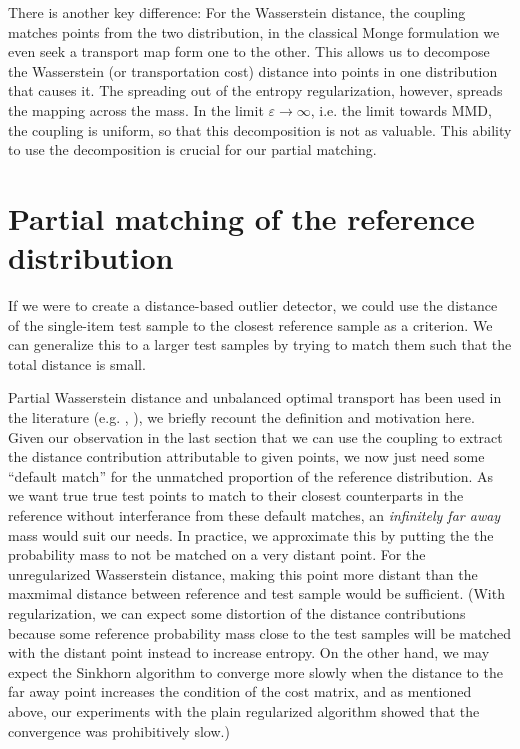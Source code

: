 \documentclass[a4paper,twoside,10pt]{article}
\theoremstyle{plain}
\theoremstyle{remark}
\begin{document}
There is another key difference: For the Wasserstein distance, the coupling matches points from the two distribution, in the classical Monge formulation we even seek a transport map form one to the other.
This allows us to decompose the Wasserstein (or transportation cost) distance into points in one distribution that causes it. The spreading out of the entropy regularization, however, spreads the mapping across the mass. In the limit $\varepsilon \rightarrow \infty$, i.e. the limit towards MMD, the coupling is uniform, so that this decomposition is not as valuable. This ability to use the decomposition is crucial for our partial matching.

\section{Partial matching of the reference distribution}
\label{sec:partial_wasserstein}

If we were to create a distance-based outlier detector, we could use the distance of the single-item test sample to the closest reference sample as a criterion. We can generalize this to a larger test samples by trying to match them such that the total distance is small. 

Partial Wasserstein distance and unbalanced optimal transport has been used in the literature (e.g. \cite{CaffarelliMcCann}, \cite{Chapel}), we briefly recount the definition and motivation here.
Given our observation in the last section that we can use the coupling to extract the distance contribution attributable to given points, we now just need some ``default match'' for the unmatched proportion of the reference distribution. As we want true true test points to match to their closest counterparts in the reference without interferance from these default matches, an \textit{infinitely far away} mass would suit our needs. In practice, we approximate this by putting the the probability mass to not be matched on a very distant point. For the unregularized Wasserstein distance, making this point more distant than the maxmimal distance between reference and test sample would be sufficient. (With regularization, we can expect some distortion of the distance contributions because some reference probability mass close to the test samples will be matched with the distant point instead to increase entropy. On the other hand, we may expect the Sinkhorn algorithm to converge more slowly when the distance to the far away point increases the condition of the cost matrix, and as mentioned above, our experiments with the plain regularized algorithm showed that the convergence was prohibitively slow.)
\end{document}
